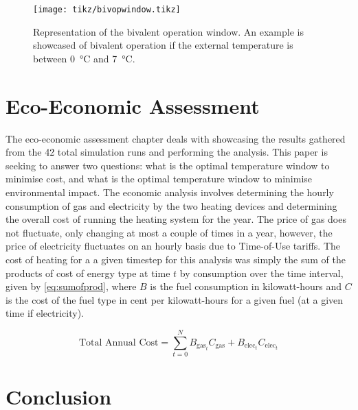 \begin{figure}[htb]
    \centering
    \texttt{[image: tikz/bivopwindow.tikz]}
    \caption{Representation of the bivalent operation window. An example is showcased of bivalent operation if the external temperature is between \qty{0}{\celsius} and \qty{7}{\celsius}.}
    \label{fig:bivopwindow}
\end{figure}

\section{Eco-Economic Assessment}\label{sec:methodecoeco}
The eco-economic assessment chapter deals with showcasing the results gathered from the 42 total simulation runs and performing the analysis. This paper is seeking to answer two questions: what is the optimal temperature window to minimise cost, and what is the optimal temperature window to minimise environmental impact. The economic analysis involves determining the hourly consumption of gas and electricity by the two heating devices and determining the overall cost of running the heating system for the year. The price of gas does not fluctuate, only changing at most a couple of times in a year, however, the price of electricity fluctuates on an hourly basis due to Time-of-Use tariffs. The cost of heating for a a given timestep for this analysis was simply the sum of the products of cost of energy type at time $t$ by consumption over the time interval, given by \cref{eq:sumofprod}, where $B$ is the fuel consumption in kilowatt-hours and $C$ is the cost of the fuel type in cent per kilowatt-hours for a given fuel (at a given time if electricity).


\begin{equation}
    \text{Total Annual Cost} = \sum_{t=0}^{N}B_{\text{gas}_t} C_\text{gas} + B_{\text{elec}_t} C_{\text{elec}_t}\label{eq:sumofprod}
\end{equation}


\section{Conclusion}\label{sec:methodconclusion}


